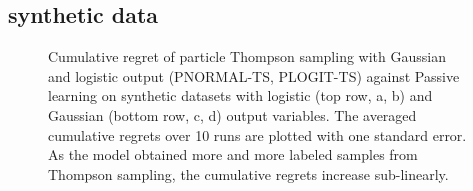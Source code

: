 \subsection{synthetic data}
\begin{figure}[t]
	\centering
	\caption{\label{fig:synthetic} Cumulative regret of particle Thompson sampling with Gaussian and logistic output ({\sc PNORMAL-TS, PLOGIT-TS}) against Passive learning 
	on synthetic datasets with logistic	(top row, a, b) and Gaussian (bottom row, c, d) output variables.
	The averaged cumulative regrets over 10 runs are plotted with one standard error. 
	As the model obtained more and more labeled samples from Thompson sampling, 
	the cumulative regrets increase sub-linearly.}
\end{figure}

